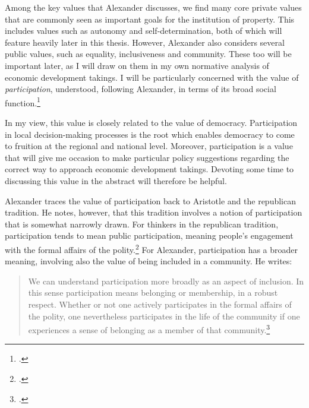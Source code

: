 \documentclass[12pt,a4paper]{book} %
\begin{document}
Among the key values that Alexander discusses, we find many core private values that are commonly seen as important goals for the institution of property. This includes values such as autonomy and self-determination, both of which will feature heavily later in this thesis. However, Alexander also considers several public values, such as equality, inclusiveness and community. These too will be important later, as I will draw on them in my own normative analysis of economic development takings. I will be particularly concerned with the value of {\it participation}, understood, following Alexander, in terms of its broad social function.\footcite[1275-1276]{alexander14}

In my view, this value is closely related to the value of democracy. Participation in local decision-making processes is the root which enables democracy to come to fruition at the regional and national level. Moreover, participation is a value that will give me occasion to make particular policy suggestions regarding the correct way to approach economic development takings. Devoting some time to discussing this value in the abstract will therefore be helpful.

Alexander traces the value of participation back to Aristotle and the republican tradition. He notes, however, that this tradition involves a notion of participation that is somewhat narrowly drawn. For thinkers in the republican tradition, participation tends to mean public participation, meaning people's engagement with the formal affairs of the polity.\footcite[1275]{alexander14} For Alexander, participation has a broader meaning, involving also the value of being included in a community. He writes:

\begin{quote}
We can understand participation more broadly as an aspect of inclusion. In this sense participation means belonging or membership, in a robust respect. Whether or not one actively participates in the formal affairs of the polity, one nevertheless participates in the life of the community if one experiences a sense of belonging as a member of that community.\footcite[1275]{alexander14}
\end{quote}
\end{document}
